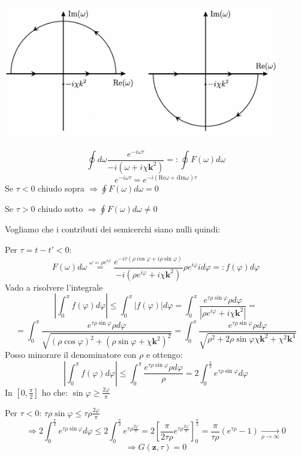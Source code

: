 \documentclass[a4paper,11pt]{report}
\newcommand{\kk}{\boldsymbol{k}}
\newcommand{\z}{\boldsymbol{z}}
\begin{document}
\begin{center}
\includegraphics[width=0.9\textwidth]{immagini/complex}
\end{center}
\[
\oint d\omega\frac{e^{-i\omega\tau}}{-i(\omega+i\chi \kk^2)}=:\oint F(\omega) d\omega
\]
\[
e^{-i\omega\tau}=e^{-i(\mathrm{Re}\omega+i\mathrm{Im}\omega)\tau}
\]
Se $\tau<0$ chiudo sopra $\Rightarrow \oint F(\omega) d\omega = 0$

Se $\tau>0$ chiudo sotto $\Rightarrow \oint F(\omega) d\omega \ne 0$

\smallskip

Vogliamo che i contributi dei semicerchi siano nulli quindi:

Per $\tau=t-t'<0$:
\[
F(\omega)d\omega \overset{\omega=\rho e^{i\varphi}}{=}\frac{e^{-i\tau(\rho\cos\varphi+i\rho\sin\varphi)}}{-i(\rho e^{i\varphi}+i\chi \kk^2)}\rho e^{i\varphi}id\varphi=:f(\varphi)d\varphi
\]
Vado a risolvere l'integrale
\[
\left|\int_{0}^{\pi}f(\varphi)d\varphi\right|\leq\int_{0}^{\pi}\left|f(\varphi)\right|d\varphi=
\int_{0}^{\pi}\frac{e^{\tau\rho\sin\varphi}\rho d\varphi}{\left|\rho e^{i\varphi}+i\chi \kk^2\right|}=
\]
\[
=\int_{0}^{\pi}\frac{e^{\tau\rho\sin\varphi}\rho d\varphi}{\sqrt{\left(\rho\cos\varphi\right)^2+\left(\rho\sin\varphi+\chi \kk ^2\right)^2}}
=\int_{0}^{\pi}\frac{e^{\tau\rho\sin\varphi}\rho d\varphi}{\sqrt{\rho^2+2\rho\sin\varphi\chi \kk ^2+\chi^2 \kk^4}}
\]
Posso minorare il denominatore con $\rho$ e ottengo:
\[
\left|\int_{0}^{\pi}f(\varphi)d\varphi\right|
\leq\int_{0}^{\pi}\frac{e^{\tau\rho\sin\varphi}\rho d\varphi}{\rho}=2\int_{0}^\frac{\pi}{2}e^{\tau\rho\sin\varphi} d\varphi
\]
In $[0,\frac{\pi}{2}]$ ho che: $\sin\varphi\geq\frac{2\varphi}{\pi}$


Per $\tau<0$: $\tau\rho\sin\varphi \leq \tau\rho\frac{2\varphi}{\pi}$
\[
\Rightarrow 2\int_{0}^\frac{\pi}{2}e^{\tau\rho\sin\varphi}d\varphi \leq 2\int_{0}^\frac{\pi}{2}e^{\tau\rho\frac{2\varphi}{\pi}}=
2\left[\frac{\pi}{2\tau\rho}e^{\tau\rho\frac{2\varphi}{\pi}}\right]_{0}^{\frac{\pi}{2}}=
\frac{\pi}{\tau\rho}(e^{\tau\rho}-1)\xrightarrow[\rho \rightarrow \infty]{} 0
\]
\[
\Rightarrow G(\z,\tau)=0
\]
\end{document}
